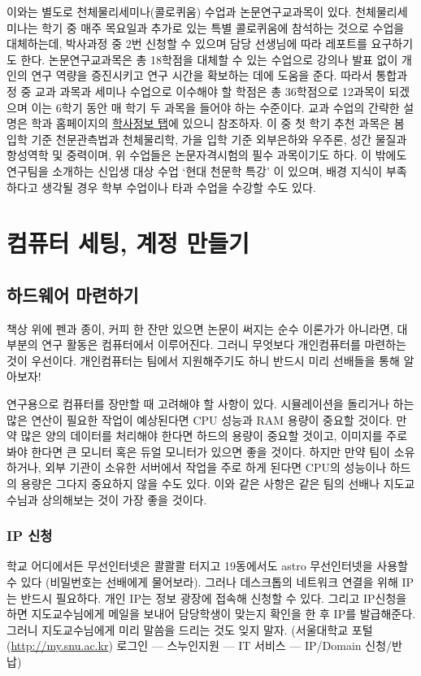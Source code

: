 이와는 별도로 천체물리세미나(콜로퀴움) 수업과 논문연구교과목이 있다. 천체물리세미나는 학기 중 매주 목요일과 추가로 있는 특별 콜로퀴움에 참석하는 것으로 수업을 대체하는데, 박사과정 중 2번 신청할 수 있으며 담당 선생님에 따라 레포트를 요구하기도 한다. 논문연구교과목은 총 18학점을 대체할 수 있는 수업으로 강의나 발표 없이 개인의 연구 역량을 증진시키고 연구 시간을 확보하는 데에 도움을 준다. 따라서 통합과정 중 교과 과목과 세미나 수업으로 이수해야 할 학점은 총 36학점으로 12과목이 되겠으며 이는 6학기 동안 매 학기 두 과목을 들어야 하는 수준이다.
교과 수업의 간략한 설명은 학과 홈페이지의 \href{http://astro1.snu.ac.kr/home/kor/info/subject_dahakwon.asp?globalmenu=3\&localmenu=5}{학사정보 탭}에 있으니 참조하자. 
이 중 첫 학기 추천 과목은 봄 입학 기준 천문관측법과 천체물리학, 가을 입학 기준 외부은하와 우주론, 성간 물질과 항성역학 및 중력이며, 위 수업들은 논문자격시험의 필수 과목이기도 하다. 
이 밖에도 연구팀을 소개하는 신입생 대상 수업 ‘현대 천문학 특강’ 이 있으며, 배경 지식이 부족하다고 생각될 경우 학부 수업이나 타과 수업을 수강할 수도 있다.

\section{컴퓨터 세팅, 계정 만들기}
\subsection{하드웨어 마련하기}
책상 위에 펜과 종이, 커피 한 잔만 있으면 논문이 써지는 순수 이론가가 아니라면, 대부분의 연구 활동은 컴퓨터에서 이루어진다. 그러니 무엇보다 개인컴퓨터를 마련하는 것이 우선이다. 개인컴퓨터는 팀에서 지원해주기도 하니 반드시 미리 선배들을 통해 알아보자!

연구용으로 컴퓨터를 장만할 때 고려해야 할 사항이 있다. 시뮬레이션을 돌리거나 하는 많은 연산이 필요한 작업이 예상된다면 CPU 성능과 RAM 용량이 중요할 것이다. 만약 많은 양의 데이터를 처리해야 한다면 하드의 용량이 중요할 것이고, 이미지를 주로 봐야 한다면 큰 모니터 혹은 듀얼 모니터가 있으면 좋을 것이다. 하지만 만약 팀이 소유하거나, 외부 기관이 소유한 서버에서 작업을 주로 하게 된다면 CPU의 성능이나 하드의 용량은 그다지 중요하지 않을 수도 있다. 이와 같은 사항은 같은 팀의 선배나 지도교수님과 상의해보는 것이 가장 좋을 것이다.

\subsubsection{IP 신청}
학교 어디에서든 무선인터넷은 콸콸콸 터지고 19동에서도 astro 무선인터넷을 사용할 수 있다 (비밀번호는 선배에게 물어보라). 그러나 데스크톱의 네트워크 연결을 위해 IP는 반드시 필요하다. 개인 IP는 정보 광장에 접속해 신청할 수 있다. 그리고 IP신청을 하면 지도교수님에게 메일을 보내어 담당학생이 맞는지 확인을 한 후 IP를 발급해준다. 그러니 지도교수님에게 미리 말씀을 드리는 것도 잊지 말자. (서울대학교 포털 (\url{http://my.snu.ac.kr}) 로그인 --- 스누인지원 --- IT 서비스 --- IP/Domain 신청/반납)

